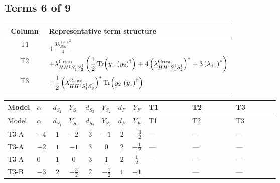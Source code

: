 \documentclass[8pt]{article}
\begin{document}
\begin{landscape}
\subsection*{Terms 6 of 9}
\begin{center}
\begin{tabular}{@{}c >{\raggedright\arraybackslash}p{0.82\linewidth}@{}}
\toprule
Column & Representative term structure \\
\midrule
T1 & \(\displaystyle +\frac{3 {\lambda_{HS_1}^{(A)}}^2}{4}\) \\
\midrule
T2 & \(\displaystyle +{\lambda_{H H^\dagger S_1^\dagger S_2^\dagger}^{\rm Cross}} \left(\frac{1}{2} \operatorname{Tr}\!\left({y_1}\,\left({y_2}\right)^{\dagger}\right)+4 \left({\lambda_{H H^\dagger S_1^\dagger S_2^\dagger}^{\rm Cross}}\right)^{*}+3 \left({\lambda_{11}}\right)^{*}\right)\) \\
\midrule
T3 & \(\displaystyle +\frac{1}{2} \left({\lambda_{H H^\dagger S_1^\dagger S_2^\dagger}^{\rm Cross}}\right)^{*} \operatorname{Tr}\!\left({y_2}\,\left({y_1}\right)^{\dagger}\right)\) \\
\midrule
\bottomrule
\end{tabular}
\end{center}
\smallskip
\tiny
\begin{longtable}{@{}llcccccc >{\raggedright\arraybackslash}p{0.21\linewidth} >{\raggedright\arraybackslash}p{0.21\linewidth} >{\raggedright\arraybackslash}p{0.21\linewidth}@{}}
\toprule
Model & $\alpha$ & $d_{S_1}$ & $Y_{S_1}$ & $d_{S_2}$ & $Y_{S_2}$ & $d_F$ & $Y_F$ & T1 & T2 & T3 \\
\midrule
\endfirsthead
\toprule
Model & $\alpha$ & $d_{S_1}$ & $Y_{S_1}$ & $d_{S_2}$ & $Y_{S_2}$ & $d_F$ & $Y_F$ & T1 & T2 & T3 \\
\midrule
\endhead
T3-A & $-4$ & $1$ & $-2$ & $3$ & $-1$ & $2$ & $-\frac{3}{2}$ & --- & --- & --- \\
\midrule
T3-A & $-2$ & $1$ & $-1$ & $3$ & $0$ & $2$ & $-\frac{1}{2}$ & --- & --- & --- \\
\midrule
T3-A & $0$ & $1$ & $0$ & $3$ & $1$ & $2$ & $\frac{1}{2}$ & --- & --- & --- \\
\midrule
T3-B & $-3$ & $2$ & $-\frac{3}{2}$ & $2$ & $-\frac{1}{2}$ & $1$ & $-1$ & \scriptsize\adjustbox{max width=\linewidth}{$\begin{gathered} +\frac{3 {\lambda_{HS_1}^{(A)}}^2}{4}\end{gathered}$} & --- & --- \\
\midrule

\end{longtable}
\end{landscape}
\end{document}
